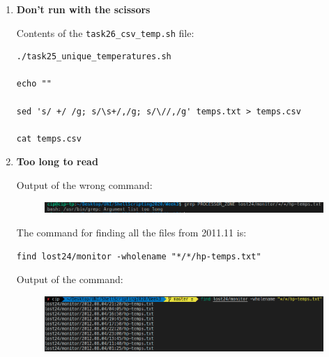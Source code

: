 \documentclass[9pt]{article}
\begin{document}
\begin{enumerate}
\begin{lstlisting}[breaklines=true]
rm -f temps.txt
rm -f temps_tmp.txt

for dir in `find $workdir -type d`
do
    # ls $dir/hp-temps.txt
    grep "PROCESSOR_ZONE *[0-9][0-9]C" $dir/hp-temps.txt -s | cut -b 32-34 >> temps_tmp.txt
done

sort temps_tmp.txt | uniq >> temps.txt

rm temps_tmp.txt

cat temps.txt
        \end{lstlisting}

        Output of the execution:
        \begin{lstlisting}
22C
23C
24C
25C
26C
27C
28C
29C
30C
31C
        \end{lstlisting}

    \item \textbf{Don't run with the scissors}

        Contents of the \texttt{task26\_csv\_temp.sh} file:
        \begin{lstlisting}
./task25_unique_temperatures.sh

echo ""

sed 's/ +/ /g; s/\s+/,/g; s/\//,/g' temps.txt > temps.csv

cat temps.csv
        \end{lstlisting}

    \item \textbf{Too long to read}
    
        Output of the wrong command:
        \begin{figure}[h!]
            \centering
            \includegraphics[width=\linewidth-2cm]{img/27_1.png}
        \end{figure}        

        The command for finding all the files from 2011.11 is:
        \begin{lstlisting}
find lost24/monitor -wholename "*/*/hp-temps.txt"
        \end{lstlisting}

        Output of the command:
        \begin{figure}[h!]
            \centering
            \includegraphics[width=\linewidth-2cm]{img/27_2.png}
        \end{figure}     
    

\end{enumerate}
\end{document}
